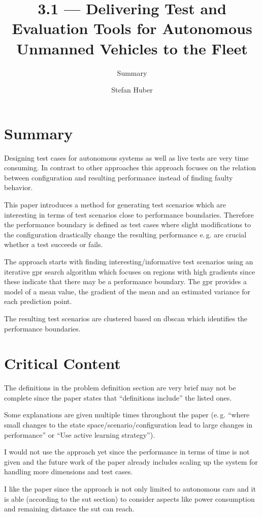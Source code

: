 \documentclass[oneside, notitlepage, twocolumn]{scrartcl}
\title{\LARGE 3.1 --- Delivering Test and Evaluation Tools for Autonomous Unmanned Vehicles to the Fleet}
\subtitle{Summary}
\author{Stefan Huber}
\newcommand{\eg}{e.\,g.\xspace}
\begin{document}
\maketitle

\section{Summary}
Designing test cases for autonomous systems as well as live tests are very time consuming.
In contrast to other approaches this approach focuses on the relation between configuration and resulting performance instead of finding faulty behavior.\par
This paper introduces a method for generating test scenarios which are interesting in terms of test scenarios close to performance boundaries.
Therefore the performance boundary is defined as test cases where slight modifications to the configuration drastically change the resulting performance \eg{} are crucial whether a test succeeds or fails.\par
The approach starts with finding interesting/informative test scenarios using an iterative \gls{gpr} search algorithm which focuses on regions with high gradients since these indicate that there may be a performance boundary.
The \gls{gpr} provides a model of a mean value, the gradient of the mean and an estimated variance for each prediction point.\par
The resulting test scenarios are clustered based on \gls{dbscan} which identifies the performance boundaries.

\section{Critical Content}
The definitions in the problem definition section are very brief may not be complete since the paper states that ``definitions include'' the listed ones.\par
Some explanations are given multiple times throughout the paper (\eg{} ``where small changes to the state space/scenario/configuration lead to large changes in performance'' or ``Use active learning strategy'').\par
I would not use the approach yet since the performance in terms of time is not given and the future work of the paper already includes scaling up the system for handling more dimensions and test cases.\par
I like the paper since the approach is not only limited to autonomous cars and it is able (according to the \gls{sut} section) to consider aspects like power consumption and remaining distance the \gls{sut} can reach.
\end{document}
